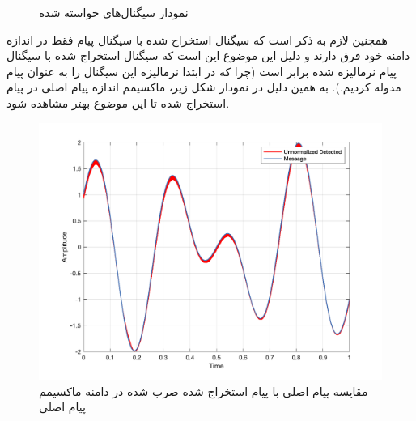\documentclass[10pt]{article}
\begin{document}
\begin{figure}[h]\label{fig:q1}
	\begin{center}
		\hspace{0.03\linewidth}
	\end{center}
	\caption{نمودار سیگنال‌های خواسته شده}
\end{figure}

\noindent
همچنین لازم به ذکر است که سیگنال استخراج شده با سیگنال پیام فقط در اندازه دامنه خود فرق دارند و دلیل این موضوع این است که سیگنال استخراج شده با سیگنال پیام نرمالیزه شده برابر است (چرا که در ابتدا نرمالیزه این سیگنال را به عنوان پیام مدوله کردیم.). به همین دلیل در نمودار شکل زیر، ماکسیمم اندازه پیام اصلی در پیام استخراج شده تا این موضوع بهتر مشاهده شود.
\begin{figure}[h]
	\centering
	\includegraphics[width=0.7\linewidth]{../pics/q1-3}
	\caption{مقایسه پیام اصلی با پیام استخراج شده ضرب شده در دامنه ماکسیمم پیام اصلی}
	\label{fig:q1-3}
\end{figure}
\newpage
\end{document}
